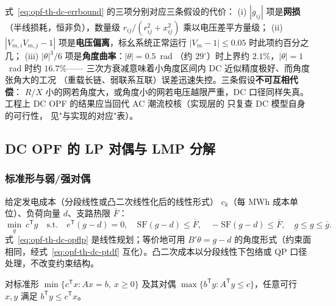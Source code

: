 \begin{remark}[误差界的物理读法]\label{rem:opf-th-dc-errread}
式~\eqref{eq:opf-th-dc-errbound} 的三项分别对应三条假设的代价：
(i) $|g_{ij}|$ 项是\textbf{网损}（半线损耗，恒非负），数量级
$r_{ij}/(r_{ij}^2+x_{ij}^2)$ 乘以电压差平方量级；
(ii) $|V_{m,i}V_{m,j}-1|$ 项是\textbf{电压偏离}，标幺系统正常运行
$|V_m-1|\le0.05$ 时此项约百分之几；
(iii) $|\theta|^3/6$ 项是\textbf{角度曲率}：$|\theta|=0.5$~rad
（约 $29^\circ$）时上界约 $2.1\%$，$|\theta|=1$~rad 时约 $16.7\%$——
三次方衰减意味着小角度区间内 DC 近似精度极好、而角度张角大的工况
（重载长链、弱联系互联）误差迅速失控。三条假设\textbf{不可互相代偿}：
$R/X$ 小的网若角度大，或角度小的网若电压越限严重，DC 口径同样失真。
工程上 DC OPF 的结果应当回代 AC 潮流校核（实现层的
 只复查 DC 模型自身的可行性，
见"与实现的对应"表）。
\end{remark}

\subsection{DC OPF 的 LP 对偶与 LMP 分解}\label{sec:opf-th-dc-lmp}

\subsubsection{标准形与弱/强对偶}

\begin{definition}\label{def:opf-th-dc-opflp}
给定发电成本（分段线性或凸二次线性化后的线性形式）
$c_k$（每 MWh 成本单位）、负荷向量 $d$、支路热限 $\overline F$：
\begin{equation}
\min_{g}\ c^{\mathsf T}g
\quad\text{s.t.}\quad
e^{\mathsf T}(g-d)=0,\quad
\mathrm{SF}(g-d)\le\overline F,\quad
-\mathrm{SF}(g-d)\le\overline F,\quad
\underline g\le g\le\overline g .
\label{eq:opf-th-dc-opflp}
\end{equation}
式~\eqref{eq:opf-th-dc-opflp} 是线性规划；等价地可用
$B'\theta=g-d$ 的角度形式（约束面相同，经式~\eqref{eq:opf-th-dc-ptdf}
互化）。凸二次成本以分段线性下包络或 QP 口径处理，不改变约束结构。
\end{definition}

\begin{lemma}[LP 弱对偶]\label{lem:opf-th-dc-weak}
对标准形 $\min\{c^{\mathsf T}x:Ax=b,\ x\ge0\}$ 及其对偶
$\max\{b^{\mathsf T}y:A^{\mathsf T}y\le c\}$，任意可行 $x,y$ 满足
$b^{\mathsf T}y\le c^{\mathsf T}x$。
\end{lemma}

